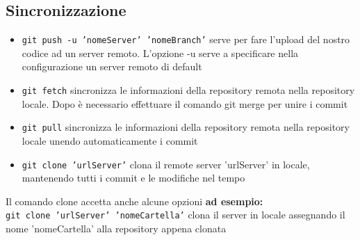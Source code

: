 \documentclass[12pt, a4paper]{article}
\begin{document}
\subsection{Sincronizzazione}
\begin{itemize}
    \item \texttt{git push -u 'nomeServer' 'nomeBranch'} serve per fare l’upload del nostro codice ad un server remoto. L’opzione -u serve a specificare nella configurazione un server remoto di default
    \item \texttt{git fetch} sincronizza le informazioni della repository remota nella repository locale. Dopo è necessario effettuare il comando git merge per unire i commit
    \item \texttt{git pull} sincronizza le informazioni della repository remota nella repository locale unendo automaticamente i commit
    \item \texttt{git clone 'urlServer'} clona il remote server 'urlServer' in locale, mantenendo tutti i commit e le modifiche nel tempo
\end{itemize}
Il comando clone accetta anche alcune opzioni \textbf{ad esempio:}\\
\texttt{git clone 'urlServer' 'nomeCartella'} clona il server in locale assegnando il nome 'nomeCartella' alla repository appena clonata
\clearpage

\end{document}
